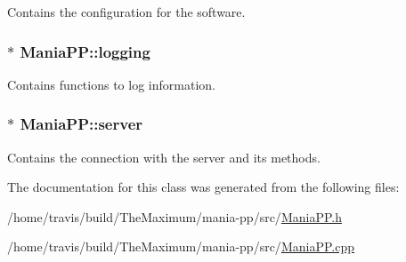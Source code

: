 Contains the configuration for the software. 

\hypertarget{classManiaPP_aa4cea090301bdf0bf652ad377e7b01c0}{
\subsubsection[{logging}]{$\ast$ Mania\-P\-P\-::logging\hspace{0.3cm}{\ttfamily [private]}}}\label{classManiaPP_aa4cea090301bdf0bf652ad377e7b01c0}


Contains functions to log information. 

\hypertarget{classManiaPP_ab81311d6901990cb99a7a30e0cbaab11}{
\subsubsection[{server}]{$\ast$ Mania\-P\-P\-::server\hspace{0.3cm}{\ttfamily [private]}}}\label{classManiaPP_ab81311d6901990cb99a7a30e0cbaab11}


Contains the connection with the server and its methods. 



The documentation for this class was generated from the following files\-:\begin{DoxyCompactItemize}
\item 
/home/travis/build/\-The\-Maximum/mania-\/pp/src/\hyperlink{ManiaPP_8h}{Mania\-P\-P.\-h}\item 
/home/travis/build/\-The\-Maximum/mania-\/pp/src/\hyperlink{ManiaPP_8cpp}{Mania\-P\-P.\-cpp}\end{DoxyCompactItemize}

